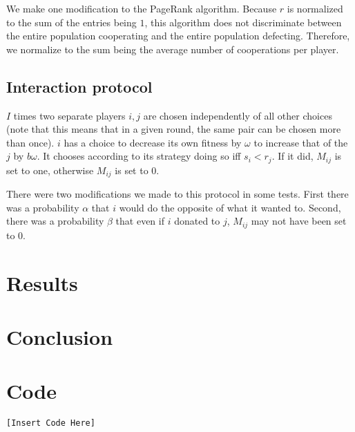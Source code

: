 \documentclass{amsart}
\begin{document}
We make one modification to the PageRank algorithm. Because $r$ is normalized to the sum of the entries being $1$, this algorithm does not discriminate between the entire population cooperating and the entire population defecting. Therefore, we normalize to the sum being the average number of cooperations per player.

\subsection{Interaction protocol}
$I$ times two separate players $i,j$ are chosen independently of all other choices (note that this means that in a given round, the same pair can be chosen more than once). $i$ has a choice to decrease its own fitness by $\omega$ to increase that of the $j$ by $b \omega$. It chooses according to its strategy doing so iff $s_i < r_j$. If it did, $M_{ij}$ is set to one, otherwise $M_{ij}$ is set to $0$. 

There were two modifications we made to this protocol in some tests. First there was a probability $\alpha$ that $i$ would do the opposite of what it wanted to. Second, there was a probability $\beta$ that even if $i$ donated to $j$, $M_{ij}$ may not have been set to $0$. 

\section{Results}

\section{Conclusion}

\section{Code}
\begin{verbatim}
[Insert Code Here]
\end{verbatim}




\end{document}
